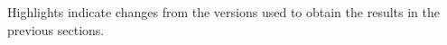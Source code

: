 \begin{table}
\begin{threeparttable}
\begin{tabular}{lllllll}
    \bottomrule
    \end{tabular}
    \begin{tablenotes}
        \item Highlights indicate changes from the versions used to obtain the results in the previous sections.
    \end{tablenotes}
    \end{threeparttable}
\end{table}



